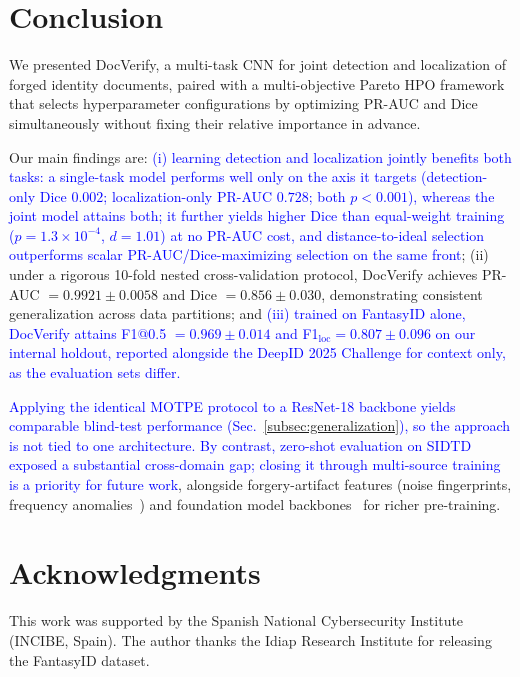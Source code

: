 \documentclass[final,5p,times,twocolumn,number]{elsarticle}
\newcommand{\rev}[1]{\textcolor{blue}{#1}}
\begin{document}

\section{Conclusion}
\label{sec:conclusion}

We presented DocVerify, a multi-task CNN for joint detection and localization of
forged identity documents, paired with a multi-objective Pareto HPO framework
that selects hyperparameter configurations by optimizing PR-AUC and Dice
simultaneously without fixing their relative importance in advance.

Our main findings are: \rev{(i) learning detection and localization jointly
benefits both tasks: a single-task model performs well only on the axis it
targets (detection-only Dice $0.002$; localization-only PR-AUC $0.728$; both
$p < 0.001$), whereas the joint model attains both; it further yields higher
Dice than equal-weight training ($p = 1.3 \times 10^{-4}$, $d = 1.01$) at no
PR-AUC cost, and distance-to-ideal selection outperforms scalar
PR-AUC/Dice-maximizing selection on the same front}; (ii) under a rigorous 10-fold
nested cross-validation protocol, DocVerify achieves PR-AUC $= 0.9921 \pm
0.0058$ and Dice $= 0.856 \pm 0.030$, demonstrating consistent generalization
across data partitions; and \rev{(iii) trained on FantasyID alone, DocVerify
attains F1@0.5 $= 0.969 \pm 0.014$ and F1$_{\text{loc}} = 0.807 \pm 0.096$ on our
internal holdout, reported alongside the DeepID 2025 Challenge for context only,
as the evaluation sets differ.}

\rev{Applying the identical MOTPE protocol to a ResNet-18 backbone yields
comparable blind-test performance (Sec.~\ref{subsec:generalization}), so the
approach is not tied to one architecture. By contrast, zero-shot evaluation on
SIDTD exposed a substantial cross-domain gap; closing it through multi-source
training is a priority for future work}, alongside forgery-artifact features
(noise fingerprints, frequency anomalies~\citep{cozzolino2020noiseprint}) and
foundation model backbones~\citep{fakeidet2025} for richer pre-training.

\section*{Acknowledgments}
This work was supported by the Spanish National Cybersecurity Institute (INCIBE,
Spain). The author thanks the Idiap Research Institute for releasing the
FantasyID dataset.
\end{document}
